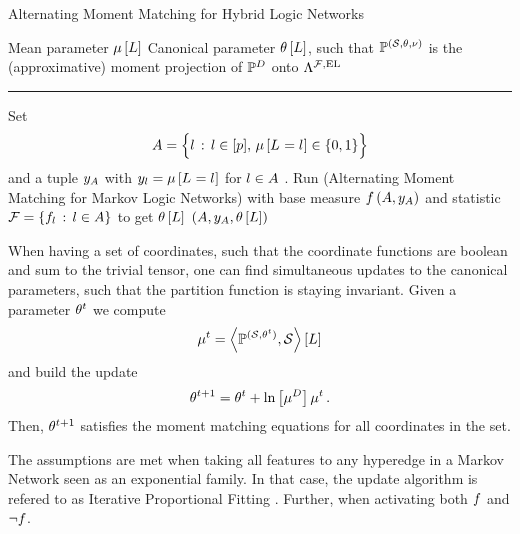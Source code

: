 \begin{algorithm}[hbt!]
    \caption{Alternating Moment Matching for Hybrid Logic Networks}\label{alg:AMM_HLN}
    \begin{algorithmic}
        \Require Mean parameter $\mu\left[L\right]$
        \Ensure Canonical parameter $\theta\left[L\right]$, such that $\mathbb{P}^{(\mathcal{S},\theta,\nu)}$ is the (approximative) moment projection of $\mathbb{P}^{D}$ onto $\Lambda^{\mathcal{F},\mathrm{EL}}$
        \hrule
        \State Set
        \begin{align*}
            A = \Big\{ l \,:\, l\in[p] ,\, \mu\left[L_{}=l_{}\right]\in\{0,1\} \Big\}
        \end{align*}
        and a tuple $y_{A}$ with $y_{l}=\mu\left[L_{}=l_{}\right]$ for $l\in A$ .
        \State Run  (Alternating Moment Matching for Markov Logic Networks) with base measure $f\left(A,y_{A}\right)$ and statistic $\mathcal{F}=\{f_{l}\,:\,l\in A\}$ to get $\theta\left[L\right]$
        \State \Return $(A,y_{A},\theta\left[L\right])$
    \end{algorithmic}
\end{algorithm}



\begin{remark}
    When having a set of coordinates, such that the coordinate functions are boolean and sum to the trivial tensor, one can find simultaneous updates to the canonical parameters, such that the partition function is staying invariant.
    Given a parameter $\theta^t$ we compute
    \[ \mu^t = \left\langle \mathbb{P}^{(\mathcal{S},\theta^t)}, \mathcal{S}\right\rangle \left[ L \right] \]
    and build the update
    \[ \theta^{t+1} = \theta^t + \ln \left[ \mu^{D} \right]{\mu^t} \, . \]
    Then, $\theta^{t+1}$ satisfies the moment matching equations for all coordinates in the set.


    The assumptions are met when taking all features to any hyperedge in a Markov Network seen as an exponential family.
    In that case, the update algorithm is refered to as Iterative Proportional Fitting \cite{wainwright_graphical_2008}.
    Further, when activating both $f$ and $\lnot f$.

\end{remark}


